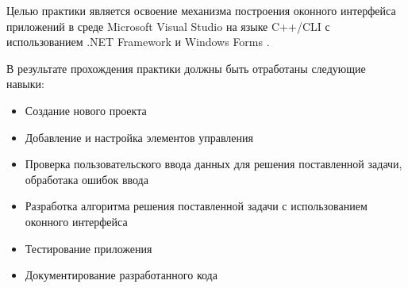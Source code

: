 \intro

Целью практики является освоение механизма построения оконного интерфейса приложений в среде Microsoft Visual Studio на языке C++/CLI с использованием .NET Framework и Windows Forms \cite{cite1, cite3}.

В результате прохождения практики должны быть отработаны следующие навыки:

\begin{itemize}
    \item{Создание нового проекта}
    \item{Добавление и настройка элементов управления}
    \item{Проверка пользовательского ввода данных для решения поставленной задачи, обработака ошибок ввода}
    \item{Разработка алгоритма решения поставленной задачи с использованием оконного интерфейса}
    \item{Тестирование приложения}
    \item{Документирование разработанного кода}
\end{itemize}
